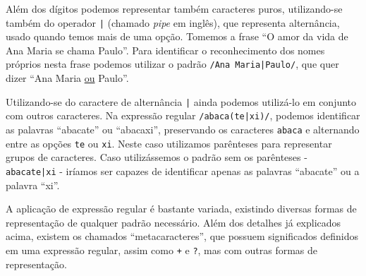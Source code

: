 Além dos dígitos podemos representar também caracteres puros, utilizando-se também do operador \texttt{|} (chamado \emph{pipe} em inglês), que representa alternância, usado quando temos mais de uma opção. Tomemos a frase ``O amor da vida de Ana Maria se chama Paulo''. Para identificar o reconhecimento dos nomes próprios nesta frase podemos utilizar o padrão \texttt{/Ana Maria|Paulo/}, que quer dizer ``Ana Maria \underline{ou} Paulo''.

Utilizando-se do caractere de alternância \texttt{|} ainda podemos utilizá-lo em conjunto com outros caracteres. Na expressão regular \texttt{/abaca(te|xi)/}, podemos identificar as palavras ``abacate'' ou ``abacaxi'', preservando os caracteres \texttt{abaca} e alternando entre as opções \texttt{te} ou \texttt{xi}. Neste caso utilizamos parênteses para representar grupos de caracteres. Caso utilizássemos o padrão sem os parênteses - \texttt{abacate|xi} - iríamos ser capazes de identificar apenas as palavras ``abacate'' ou a palavra ``xi''.

A aplicação de expressão regular é bastante variada, existindo diversas formas de representação de qualquer padrão necessário. Além dos detalhes já explicados acima, existem os chamados ``metacaracteres'', que possuem significados definidos em uma expressão regular, assim como \texttt{+} e \texttt{?}, mas com outras formas de representação.

